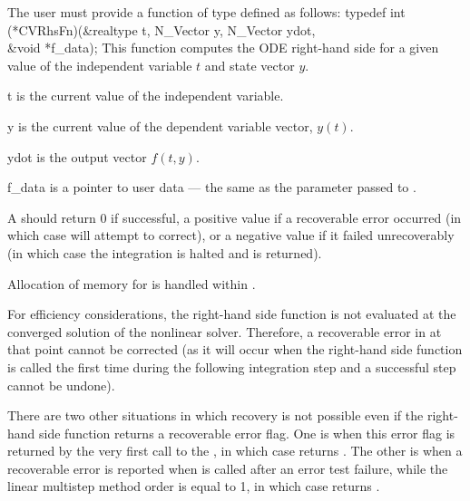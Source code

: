 The user must provide a function of type  defined as follows:
{
  typedef int (*CVRhsFn)(&realtype t, N\_Vector y, N\_Vector ydot, \\
                         &void *f\_data);
}
{
  This function computes the ODE right-hand side for a given value
  of the independent variable $t$ and state vector $y$.
}
{
  \begin{args}[f\_data]
  \item[t]
    is the current value of the independent variable.
  \item[y]
    is the current value of the dependent variable vector, $y(t)$.
  \item[ydot]
    is the output vector $f(t,y)$.
  \item[f\_data]
    is a pointer to user data --- the same as the       
    parameter passed to .   
  \end{args}
}
{
  A  should return 0 if successful, a positive value if a recoverable
  error occurred (in which case {\cvode} will attempt to correct), or a negative 
  value if it failed unrecoverably (in which case the integration is halted and
   is returned).
}
{
  Allocation of memory for  is handled within {\cvode}.

  {\warn}For efficiency considerations, the right-hand side function is not
  evaluated at the converged solution of the nonlinear solver. Therefore, a
  recoverable error in  at that point cannot be corrected (as it will 
  occur when the right-hand side function is called the first time during the 
  following integration step and a successful step cannot be undone).

  There are two other situations in which recovery is not possible
  even if the right-hand side function returns a recoverable error
  flag.  One is when this error flag is returned by the very first
  call to the , in which case {\cvode} returns
  .  The other is when a recoverable error is
  reported when  is called after an error test failure, while the
  linear multistep method order is equal to 1, in which case {\cvode}
  returns .  }

